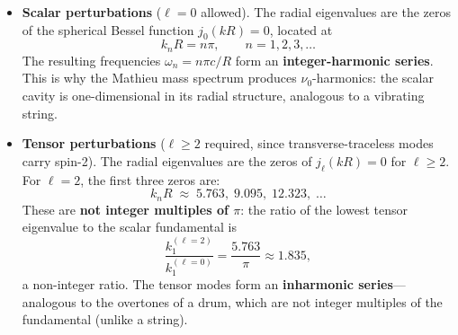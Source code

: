 \documentclass[11pt]{article}
\begin{document}
\begin{itemize}
  \item \textbf{Scalar perturbations} ($\ell = 0$
    allowed).  The radial eigenvalues are the zeros
    of the spherical Bessel function $j_0(kR) = 0$,
    located at
    \begin{equation}
      k_n R = n\pi, \qquad n = 1,2,3,\ldots
    \end{equation}
    The resulting frequencies
    $\omega_n = n\pi c/R$ form an
    \textbf{integer-harmonic series}.
    This is why the Mathieu mass spectrum produces
    $\nu_0$-harmonics: the scalar cavity is
    one-dimensional in its radial structure,
    analogous to a vibrating string.

  \item \textbf{Tensor perturbations}
    ($\ell \geq 2$ required, since
    transverse-traceless modes carry spin-2).  The
    radial eigenvalues are the zeros of
    $j_{\ell}(kR) = 0$ for $\ell \geq 2$.
    For $\ell = 2$, the first three zeros are:
    \begin{equation}
      k_n R \;\approx\; 5.763,\; 9.095,\; 12.323,
      \;\ldots
      \label{eq:bessel_zeros}
    \end{equation}
    These are \textbf{not integer multiples of
    $\pi$}: the ratio of the lowest tensor
    eigenvalue to the scalar fundamental is
    \begin{equation}
      \frac{k_1^{(\ell=2)}}{k_1^{(\ell=0)}}
      = \frac{5.763}{\pi}
      \approx 1.835,
      \label{eq:inharmonic_ratio}
    \end{equation}
    a non-integer ratio.  The tensor modes form
    an \textbf{inharmonic series}---analogous to
    the overtones of a drum, which are not integer
    multiples of the fundamental (unlike a string).
\end{itemize}
\end{document}

